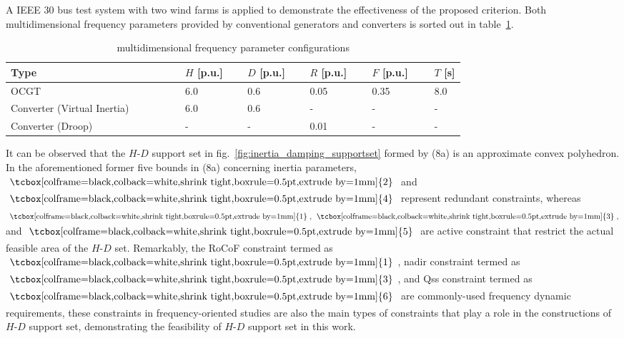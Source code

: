 \documentclass[lettersize,journal]{IEEEtran}
\newcommand{\ciao}[1]{{\setlength\fboxrule{0pt}\fbox{\tcbox[colframe=black,colback=white,shrink tight,boxrule=0.5pt,extrude by=1mm]{\small #1}}}}
\begin{document}
A IEEE $30$ bus test system with two wind farms is applied to demonstrate the effectiveness of the proposed criterion. Both multidimensional frequency parameters provided by conventional generators and converters is sorted out in table~\ref{tab:generator_parameters}.

\vspace{-0.25cm}
\begin{table}[!h]
  \centering
  \caption{multidimensional frequency parameter configurations}\vspace{-0.25cm}
  \begin{tabular}{p{0.285\linewidth} p{0.1\linewidth} p{0.1\linewidth} p{0.1\linewidth} p{0.1\linewidth} p{0.05\linewidth}}
      \hline
      \textbf{Type} & $H$ [p.u.] & $D$ [p.u.] & $R$ [p.u.] & $F$ [p.u.] & $T$ [s] \\
      \hline
      \!\!\scriptsize{OCGT} & 6.0 & 0.6 & 0.05 & 0.35 & 8.0 \\
      \!\!\scriptsize{Converter (Virtual Inertia)} & 6.0 & 0.6 & - & - & - \\
      \!\!\scriptsize{Converter (Droop)} & - & - & 0.01 & - & - \\
      \hline
  \end{tabular}
  \label{tab:generator_parameters}
\end{table}
\vspace{-0.25cm}

It can be observed that the $H$-$D$ support set in fig.~\ref{fig:inertia_damping_supportset} formed by (8a) is an approximate convex polyhedron. In the aforementioned former five bounds in (8a) concerning inertia parameters, $\ciao{2}$ and $\ciao{4}$ represent redundant constraints, whereas $\ciao{1},\,\ciao{3},$ and $\ciao{5}$ are active constraint that restrict the actual feasible area of the $H$-$D$ set.
Remarkably, the RoCoF constraint termed as $\ciao{1}$, nadir constraint termed as $\ciao{3}$, and Qss constraint termed as $\ciao{6}$ are commonly-used frequency dynamic requirements, these constraints in frequency-oriented studies are also the main types of constraints that play a role in the constructions of $H$-$D$ support set, demonstrating the feasibility of $H$-$D$ support set in this work.
\end{document}
